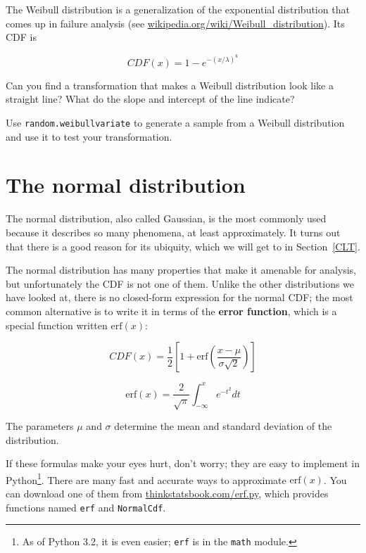 \documentclass[12pt]{book}
\begin{document}
\begin{ex}

The Weibull distribution is a generalization of the exponential
distribution that comes up in failure analysis
(see \url{wikipedia.org/wiki/Weibull_distribution}).  Its CDF is

\[ CDF(x) = 1 - e^{-(x / \lambda)^k} \]

Can you find a transformation that makes a Weibull distribution look
like a straight line?  What do the slope and intercept of the
line indicate?

Use {\tt random.weibullvariate} to generate a sample from a
Weibull distribution and use it to test your transformation.

\end{ex}


\section{The normal distribution}

\newcommand{\erf}{\mathrm{erf}}

The normal distribution, also called Gaussian, is the most commonly
used because it describes so many phenomena, at least approximately.
It turns out that there is a good reason for its ubiquity, which we
will get to in Section~\ref{CLT}.

The normal distribution has many properties that make it amenable for
analysis, but unfortunately the CDF is not one of them.  Unlike the
other distributions we have looked at, there is no closed-form
expression for the normal CDF; the most common alternative is to write
it in terms of the {\bf error function}, which is a special function
written $\erf(x)$:

\[ CDF(x) = \frac{1}{2} \left[ 1 +
  \erf \left( \frac{x - \mu}{\sigma \sqrt{2}} \right) \right] \]

\[ \erf(x) = \frac{2}{\sqrt{\pi}} \int_{-\infty}^x e^{-t^2} dt \]

The parameters $\mu$ and $\sigma$ determine the mean and standard
deviation of the distribution.

If these formulas make your eyes hurt, don't worry; they are easy to
implement in Python\footnote{As of Python 3.2, it is even easier; 
{\tt erf} is in the {\tt math} module.}.  There are many fast and
accurate ways to approximate $\erf(x)$.  You can download one of them
from \url{thinkstatsbook.com/erf.py}, which provides functions named
{\tt erf} and {\tt NormalCdf}.
\end{document}
